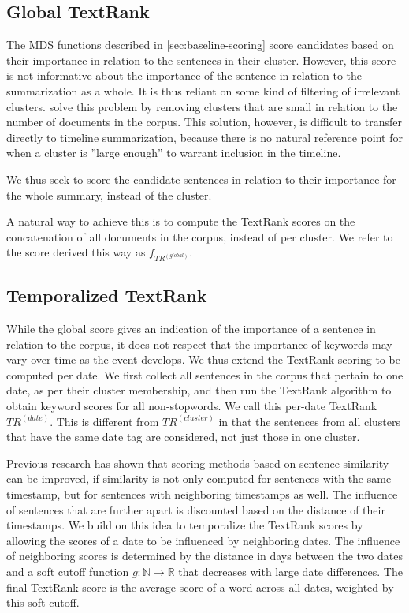 \documentclass[a4paper,BCOR=10mm]{report}
\numberwithin{lemma}{chapter}
\numberwithin{definition}{chapter}
\begin{document}
\subsection{Global TextRank}

The MDS functions described in \ref{sec:baseline-scoring} score candidates based on their importance in relation to the sentences in their cluster.
However, this score is not informative about the importance of the sentence in relation to the summarization as a whole.
It is thus reliant on some kind of filtering of irrelevant clusters. \citet{banerjee} solve this problem by removing clusters that are small in relation to the number of documents in the corpus. This solution, however, is difficult to transfer directly to timeline summarization, because there is no natural reference point for when a cluster is ''large enough'' to warrant inclusion in the timeline.

We thus seek to score the candidate sentences in relation to their importance for the whole summary, instead of the cluster.

A natural way to achieve this is to compute the TextRank \citep{textrank} scores on the concatenation of all documents in the corpus, instead of per cluster.
We refer to the score derived this way as $f_{TR^{(global)}}$.

\subsection{Temporalized TextRank}

While the global score gives an indication of the importance of a sentence in relation to the corpus, it does not respect that the importance of keywords may vary over time as the event develops.
We thus extend the TextRank scoring to be computed per date. We first collect all sentences in the corpus that pertain to one date, as per their cluster membership, and then run the TextRank algorithm to obtain keyword scores for all non-stopwords. We call this per-date TextRank $TR^{(date)}$.
This is different from $TR^{(cluster)}$ in that the sentences from all clusters that have the same date tag are considered, not just those in one cluster.

Previous research \citep{yan-trans, markert} has shown that scoring methods based on sentence similarity can be improved, if similarity is not only computed for sentences with the same timestamp, but for sentences with neighboring timestamps as well. The influence of sentences that are further apart is discounted based on the distance of their timestamps.
We build on this idea to temporalize the TextRank scores by allowing the scores of a date to be influenced by neighboring dates. The influence of neighboring scores is determined by the distance in days between the two dates and a soft cutoff function $g: \mathbb{N} \rightarrow \mathbb{R}$ that decreases with large date differences.
The final TextRank score is the average score of a word across all dates, weighted by this soft cutoff.
\end{document}
